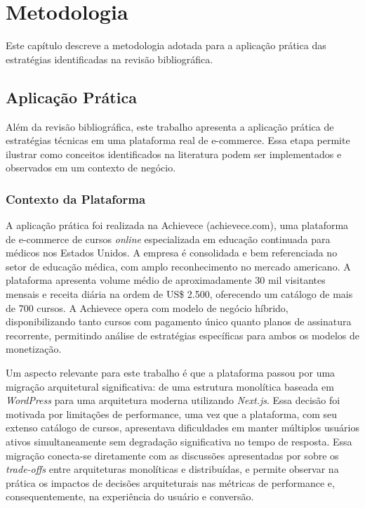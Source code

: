 \chapter{Metodologia}
\label{ch:metodologia}

Este capítulo descreve a metodologia adotada para a aplicação prática das estratégias identificadas na revisão bibliográfica.

\section{Aplicação Prática}

Além da revisão bibliográfica, este trabalho apresenta a aplicação prática de estratégias técnicas em uma plataforma real de e-commerce. Essa etapa permite ilustrar como conceitos identificados na literatura podem ser implementados e observados em um contexto de negócio.

\subsection{Contexto da Plataforma}

A aplicação prática foi realizada na Achievece (achievece.com), uma plataforma de e-commerce de cursos \textit{online} especializada em educação continuada para médicos nos Estados Unidos. A empresa é consolidada e bem referenciada no setor de educação médica, com amplo reconhecimento no mercado americano. A plataforma apresenta volume médio de aproximadamente 30 mil visitantes mensais e receita diária na ordem de US\$ 2.500, oferecendo um catálogo de mais de 700 cursos. A Achievece opera com modelo de negócio híbrido, disponibilizando tanto cursos com pagamento único quanto planos de assinatura recorrente, permitindo análise de estratégias específicas para ambos os modelos de monetização.

Um aspecto relevante para este trabalho é que a plataforma passou por uma migração arquitetural significativa: de uma estrutura monolítica baseada em \textit{WordPress} para uma arquitetura moderna utilizando \textit{Next.js}. Essa decisão foi motivada por limitações de performance, uma vez que a plataforma, com seu extenso catálogo de cursos, apresentava dificuldades em manter múltiplos usuários ativos simultaneamente sem degradação significativa no tempo de resposta. Essa migração conecta-se diretamente com as discussões apresentadas por \cite{ubur_reviewing_2023} sobre os \textit{trade-offs} entre arquiteturas monolíticas e distribuídas, e permite observar na prática os impactos de decisões arquiteturais nas métricas de performance e, consequentemente, na experiência do usuário e conversão.

